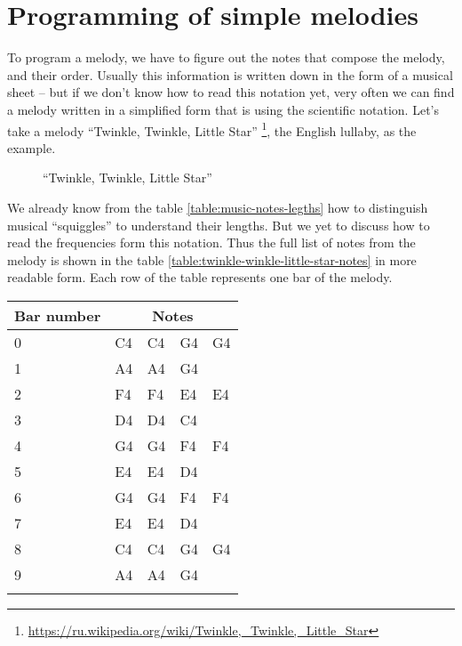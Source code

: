 \documentclass[../sparc.tex]{subfiles}
\begin{document}
\section{Programming of simple melodies}

To program a melody, we have to figure out the notes that compose the melody,
and their order.  Usually this information is written down in the form of a
musical sheet -- but if we don't know how to read this notation yet, very often
we can find a melody written in a simplified form that is using the scientific
notation.  Let's take a melody ``Twinkle, Twinkle, Little
Star'' \footnote{\url{https://ru.wikipedia.org/wiki/Twinkle,_Twinkle,_Little_Star}}, the English lullaby, as the example.

\begin{figure}[ht]
  \centering
  \caption{``Twinkle, Twinkle, Little Star''}
  \label{fig:sound-fig-3}
\end{figure}

We already know from the table \ref{table:music-notes-legths} how to distinguish
musical ``squiggles'' to understand their lengths.  But we yet to discuss how to
read the frequencies form this notation.  Thus the full list of notes from the
melody is shown in the table \ref{table:twinkle-winkle-little-star-notes} in
more readable form.  Each row of the table represents one bar of the melody.

\begin{tabular}{p{2cm}|p{2cm}|p{2cm}|p{2cm}|p{2cm}}
  Bar number & \multicolumn{4}{c}{Notes} \\
  \hline \hline
  0 & C4 & C4 & G4 & G4 \\
  \hline
  1 & A4 & A4 & G4 & \\
  \hline
  2 & F4 & F4 & E4 & E4 \\
  \hline
  3 & D4 & D4 & C4 & \\
  \hline
  4 & G4 & G4 & F4 & F4 \\
  \hline
  5 & E4 & E4 & D4 & \\
  \hline
  6 & G4 & G4 & F4 & F4 \\
  \hline
  7 & E4 & E4 & D4 & \\
  \hline
  8 & C4 & C4 & G4 & G4 \\
  \hline
  9 & A4 & A4 & G4 & \\
  \hline
  \label{table:twinkle-twinkle-little-star-notes}
\end{tabular}
\end{document}
